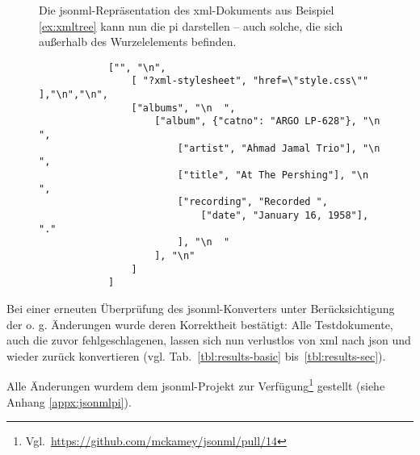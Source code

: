 \begin{figure}[h!]

    \begin{example}
        Die \acrshort{jsonml}-Repräsentation des \acrshort{xml}-Dokuments aus Beispiel \ref{ex:xmltree} kann nun die \gls{pi} darstellen -- auch solche, die sich außerhalb des Wurzelelements befinden.
        \begin{verbatim}
            ["", "\n",
                [ "?xml-stylesheet", "href=\"style.css\"" ],"\n","\n",
                ["albums", "\n  ",
                    ["album", {"catno": "ARGO LP-628"}, "\n    ",
                        ["artist", "Ahmad Jamal Trio"], "\n    ",
                        ["title", "At The Pershing"], "\n    ",
                        ["recording", "Recorded ",
                            ["date", "January 16, 1958"], "."
                        ], "\n  "
                    ], "\n"
                ]
            ]
        \end{verbatim}
    \end{example}
\end{figure}

Bei einer erneuten Überprüfung des \acrshort{jsonml}-Konverters unter Berücksichtigung der o. g. Änderungen wurde deren Korrektheit bestätigt: Alle Testdokumente, auch die zuvor fehlgeschlagenen, lassen sich nun verlustlos von \acrshort{xml} nach \acrshort{json} und wieder zurück konvertieren (vgl. Tab.~\ref{tbl:results-basic} bis~\ref{tbl:results-sec}).

Alle Änderungen wurdem dem \acrshort{jsonml}-Projekt zur Verfügung\footnote{Vgl.~\url{https://github.com/mckamey/jsonml/pull/14}} gestellt (siehe Anhang \ref{appx:jsonmlpi}).
